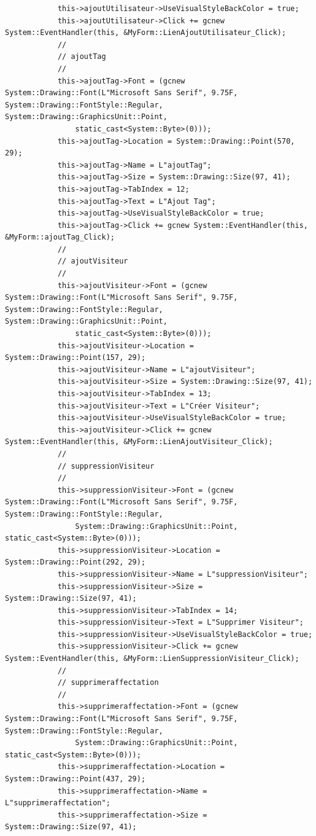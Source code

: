 \documentclass[main.tex]{subfiles}
\begin{document}
\begin{lstlisting}
			this->ajoutUtilisateur->UseVisualStyleBackColor = true;
			this->ajoutUtilisateur->Click += gcnew System::EventHandler(this, &MyForm::LienAjoutUtilisateur_Click);
			// 
			// ajoutTag
			// 
			this->ajoutTag->Font = (gcnew System::Drawing::Font(L"Microsoft Sans Serif", 9.75F, System::Drawing::FontStyle::Regular, System::Drawing::GraphicsUnit::Point,
				static_cast<System::Byte>(0)));
			this->ajoutTag->Location = System::Drawing::Point(570, 29);
			this->ajoutTag->Name = L"ajoutTag";
			this->ajoutTag->Size = System::Drawing::Size(97, 41);
			this->ajoutTag->TabIndex = 12;
			this->ajoutTag->Text = L"Ajout Tag";
			this->ajoutTag->UseVisualStyleBackColor = true;
			this->ajoutTag->Click += gcnew System::EventHandler(this, &MyForm::ajoutTag_Click);
			// 
			// ajoutVisiteur
			// 
			this->ajoutVisiteur->Font = (gcnew System::Drawing::Font(L"Microsoft Sans Serif", 9.75F, System::Drawing::FontStyle::Regular, System::Drawing::GraphicsUnit::Point,
				static_cast<System::Byte>(0)));
			this->ajoutVisiteur->Location = System::Drawing::Point(157, 29);
			this->ajoutVisiteur->Name = L"ajoutVisiteur";
			this->ajoutVisiteur->Size = System::Drawing::Size(97, 41);
			this->ajoutVisiteur->TabIndex = 13;
			this->ajoutVisiteur->Text = L"Créer Visiteur";
			this->ajoutVisiteur->UseVisualStyleBackColor = true;
			this->ajoutVisiteur->Click += gcnew System::EventHandler(this, &MyForm::LienAjoutVisiteur_Click);
			// 
			// suppressionVisiteur
			// 
			this->suppressionVisiteur->Font = (gcnew System::Drawing::Font(L"Microsoft Sans Serif", 9.75F, System::Drawing::FontStyle::Regular,
				System::Drawing::GraphicsUnit::Point, static_cast<System::Byte>(0)));
			this->suppressionVisiteur->Location = System::Drawing::Point(292, 29);
			this->suppressionVisiteur->Name = L"suppressionVisiteur";
			this->suppressionVisiteur->Size = System::Drawing::Size(97, 41);
			this->suppressionVisiteur->TabIndex = 14;
			this->suppressionVisiteur->Text = L"Supprimer Visiteur";
			this->suppressionVisiteur->UseVisualStyleBackColor = true;
			this->suppressionVisiteur->Click += gcnew System::EventHandler(this, &MyForm::LienSuppressionVisiteur_Click);
			// 
			// supprimeraffectation
			// 
			this->supprimeraffectation->Font = (gcnew System::Drawing::Font(L"Microsoft Sans Serif", 9.75F, System::Drawing::FontStyle::Regular,
				System::Drawing::GraphicsUnit::Point, static_cast<System::Byte>(0)));
			this->supprimeraffectation->Location = System::Drawing::Point(437, 29);
			this->supprimeraffectation->Name = L"supprimeraffectation";
			this->supprimeraffectation->Size = System::Drawing::Size(97, 41);

\end{lstlisting}
\end{document}
